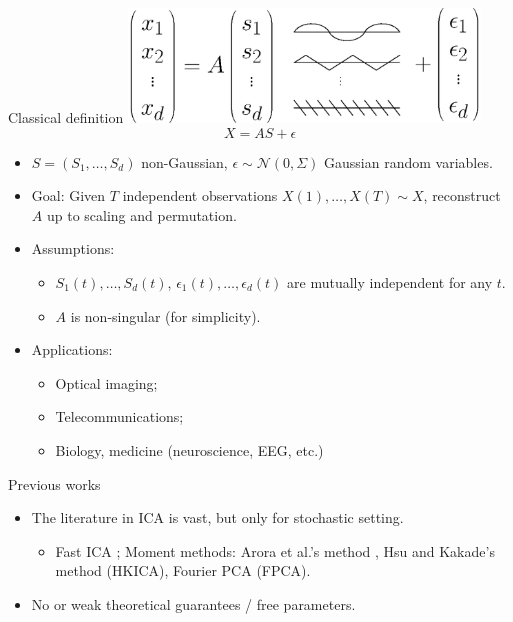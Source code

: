 \documentclass[final]{beamer} %
\newcommand{\eps}{\epsilon}
\begin{document}
\begin{frame}[c]
\begin{columns}[t,totalwidth=\textwidth]
\begin{column}{.24\textwidth}
	
		\begin{block}{Classical definition}
			\centering
			\includegraphics[width=0.7\textwidth]{ICA_model.eps}
			\begin{equation*}
				\label{eq:stoch-ICA}
				X = AS+\epsilon
			\end{equation*}
			\vspace{-1.5cm}
			\begin{itemize}
				\item $S = (S_1,\ldots, S_d)$ non-Gaussian, $\eps \sim \mathcal{N}(0,\Sigma)$ Gaussian random variables.
				\item Goal: Given $T$ independent observations $X(1), \ldots, X(T) \sim X$, reconstruct $A$ up to scaling and permutation.
\item Assumptions:
                          \begin{itemize}
				\item $S_1(t),\ldots, S_d(t)$, $\eps_1(t), \ldots, \eps_d(t)$ are mutually independent for any $t$.
				\item $A$ is non-singular
                                  (for simplicity). 
                             \end{itemize}
				\item Applications:
				\begin{itemize}
						\item Optical imaging;
						\item Telecommunications;
						\item Biology, medicine (neuroscience, EEG, etc.)
				\end{itemize}				
			\end{itemize}	
\end{block}


			
		\begin{block}{Previous works}
		\vspace{-0.5cm}
			\begin{itemize}
				\item The literature in ICA is vast, but only for stochastic setting.
				\begin{itemize}
					\item Fast ICA \citep{hyvarinen1999fast}; Moment methods:
					Arora et al.'s method \citep{arora2012provable},
					Hsu and Kakade's method \citep{hsu2013learning} (HKICA), 
					Fourier PCA \citep{goyal2014fourier} (FPCA).	
				\end{itemize}
				\item No or weak theoretical guarantees / free parameters. %
			\end{itemize}
		\end{block}


\end{column}
\end{columns}
\end{frame}
\end{document}
